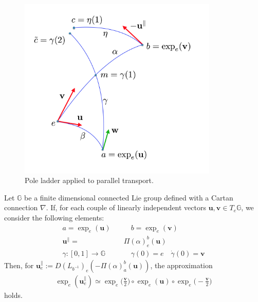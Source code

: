 \begin{figure}[htbp]
	\centering
	\includegraphics[width=9.5cm]{figures/theorem_pict.png}
	\caption{Pole ladder applied to parallel transport.}
	\label{fig:local}
\end{figure}

\begin{theorem}\label{th:local_approximation_theorem}
	Let $\mathbb{G}$ be a finite dimensional connected Lie group defined with a Cartan connection $\nabla$. 
	If, for each couple of linearly independent vectors $\mathbf{u}, \mathbf{v} \in T_{e}\mathbb{G}$, we consider the following elements:
	\begin{align*}
	a= \exp_{e}(\mathbf{u}) 
	\quad & \quad  
	b= \exp_{e}(\mathbf{v}) \\
	\mathbf{u}^{\parallel} = & \Pi(\alpha)_{e}^{b}(\mathbf{u})\\
	\gamma : [0,1] \rightarrow \mathbb{G} &\quad \gamma(0) = e \quad \dot{\gamma}(0) = \mathbf{v}
	\end{align*}
	Then, for $\mathbf{u}_{e}^{\parallel} := D(L_{b^{-1}})_{e}( -\Pi(\alpha)_{a}^{b}(\mathbf{u}))$, the approximation
	\begin{align*}
	\exp_{e}(\mathbf{u}_{e}^{\parallel}) 
	\simeq
	\exp_{e}\big(\frac{\mathbf{v}}{2}\big)   
	\circ  \exp_{e}(\mathbf{u}) 
	\circ \exp_{e}\big(-\frac{\mathbf{v}}{2}\big)
	\end{align*}
	holds.
\end{theorem}


